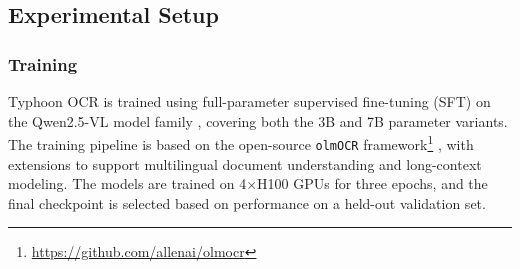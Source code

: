 \documentclass[]{typhoon} %
\begin{document}



    

\subsection{Experimental Setup}

\subsubsection{Training}

Typhoon OCR is trained using full-parameter supervised fine-tuning (SFT) on the Qwen2.5-VL model family \citep{bai2025qwen25vltechnicalreport}, covering both the 3B and 7B parameter variants. The training pipeline is based on the open-source \texttt{olmOCR} framework\footnote{\url{https://github.com/allenai/olmocr}} \citep{poznanski2025olmocrunlockingtrillionstokens}, with extensions to support multilingual document understanding and long-context modeling. The models are trained on 4$\times$H100 GPUs for three epochs, and the final checkpoint is selected based on performance on a held-out validation set.
\end{document}
